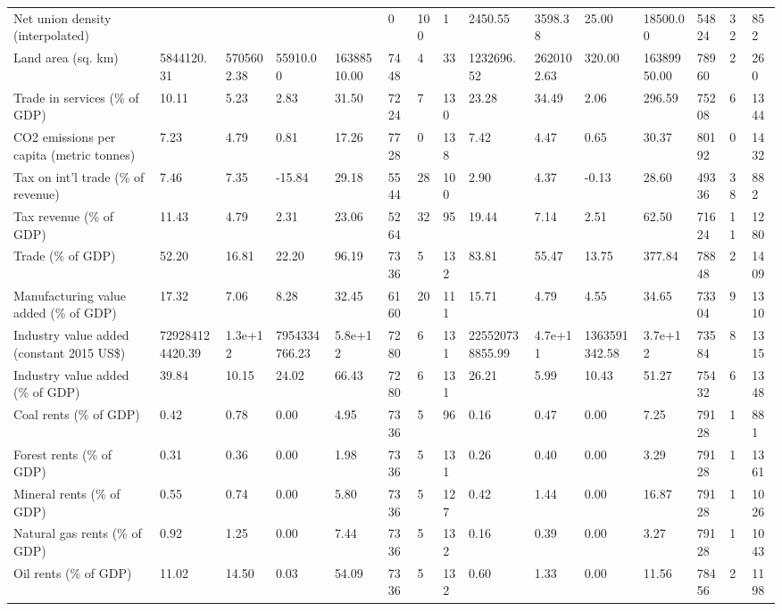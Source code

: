 \begin{longtable}{lllllllllllllll}
Net union density (interpolated) &  &  &  &  & 0 & 100 & 1 & 2450.55 & 3598.38 & 25.00 & 18500.00 & 54824 & 32 & 852\\
Land area (sq. km) & 5844120.31 & 5705602.38 & 55910.00 & 16388510.00 & 7448 & 4 & 33 & 1232696.52 & 2620102.63 & 320.00 & 16389950.00 & 78960 & 2 & 260\\
Trade in services (\% of GDP) & 10.11 & 5.23 & 2.83 & 31.50 & 7224 & 7 & 130 & 23.28 & 34.49 & 2.06 & 296.59 & 75208 & 6 & 1344\\
\addlinespace
CO2 emissions per capita (metric tonnes) & 7.23 & 4.79 & 0.81 & 17.26 & 7728 & 0 & 138 & 7.42 & 4.47 & 0.65 & 30.37 & 80192 & 0 & 1432\\
Tax on int'l trade (\% of revenue) & 7.46 & 7.35 & -15.84 & 29.18 & 5544 & 28 & 100 & 2.90 & 4.37 & -0.13 & 28.60 & 49336 & 38 & 882\\
Tax revenue (\% of GDP) & 11.43 & 4.79 & 2.31 & 23.06 & 5264 & 32 & 95 & 19.44 & 7.14 & 2.51 & 62.50 & 71624 & 11 & 1280\\
Trade (\% of GDP) & 52.20 & 16.81 & 22.20 & 96.19 & 7336 & 5 & 132 & 83.81 & 55.47 & 13.75 & 377.84 & 78848 & 2 & 1409\\
Manufacturing value added (\% of GDP) & 17.32 & 7.06 & 8.28 & 32.45 & 6160 & 20 & 111 & 15.71 & 4.79 & 4.55 & 34.65 & 73304 & 9 & 1310\\
\addlinespace
Industry value added (constant 2015 US\$) & 729284124420.39 & 1.3e+12 & 7954334766.23 & 5.8e+12 & 7280 & 6 & 131 & 225520738855.99 & 4.7e+11 & 1363591342.58 & 3.7e+12 & 73584 & 8 & 1315\\
Industry value added (\% of GDP) & 39.84 & 10.15 & 24.02 & 66.43 & 7280 & 6 & 131 & 26.21 & 5.99 & 10.43 & 51.27 & 75432 & 6 & 1348\\
Coal rents (\% of GDP) & 0.42 & 0.78 & 0.00 & 4.95 & 7336 & 5 & 96 & 0.16 & 0.47 & 0.00 & 7.25 & 79128 & 1 & 881\\
Forest rents (\% of GDP) & 0.31 & 0.36 & 0.00 & 1.98 & 7336 & 5 & 131 & 0.26 & 0.40 & 0.00 & 3.29 & 79128 & 1 & 1361\\
Mineral rents (\% of GDP) & 0.55 & 0.74 & 0.00 & 5.80 & 7336 & 5 & 127 & 0.42 & 1.44 & 0.00 & 16.87 & 79128 & 1 & 1026\\
\addlinespace
Natural gas rents (\% of GDP) & 0.92 & 1.25 & 0.00 & 7.44 & 7336 & 5 & 132 & 0.16 & 0.39 & 0.00 & 3.27 & 79128 & 1 & 1043\\
Oil rents (\% of GDP) & 11.02 & 14.50 & 0.03 & 54.09 & 7336 & 5 & 132 & 0.60 & 1.33 & 0.00 & 11.56 & 78456 & 2 & 1198\\

\end{longtable}

